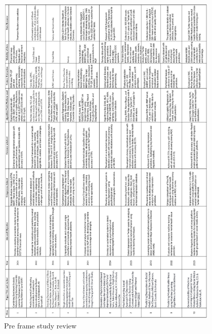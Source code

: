 \begin{figure}[H]  
    \centering
    \includegraphics[width=0.95\textwidth]{Images/preframe-study.png}  
    \caption*{Pre frame study review}
    \label{Preframe Study Review}  %
\end{figure}


\pagebreak
